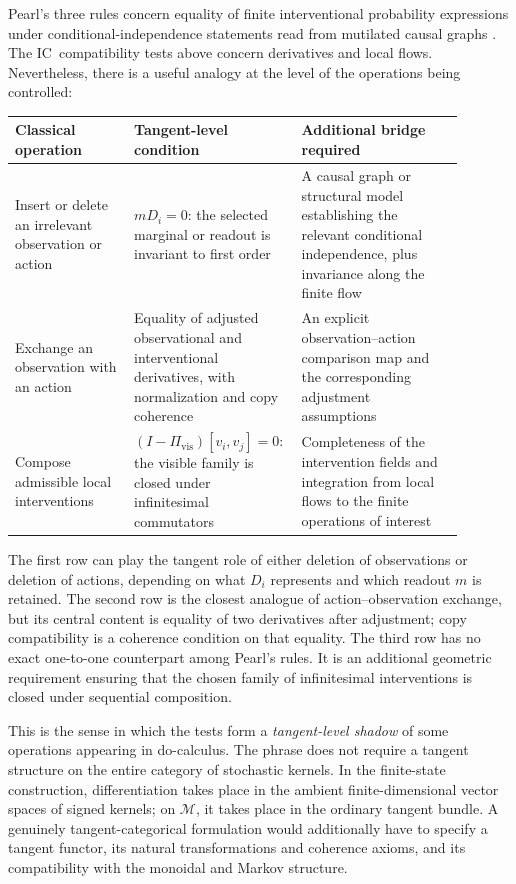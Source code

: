 \documentclass{article}
\theoremstyle{plain}
\theoremstyle{definition}
\theoremstyle{remark}
\newcommand{\M}{\mathcal M}
\newcommand{\Pvis}{\Pi_{\mathrm{vis}}}
\newcommand{\IC}{\textsc{IC}}
\begin{document}
Pearl's three rules concern equality of finite interventional probability
expressions under conditional-independence statements read from mutilated
causal graphs \citep{pearl2009causality}.  The \IC\ compatibility tests above
concern derivatives and local flows.  Nevertheless, there is a useful analogy
at the level of the operations being controlled:
\begin{center}
\begin{tabular}{p{0.25\linewidth}p{0.30\linewidth}p{0.34\linewidth}}
\toprule
\textbf{Classical operation} & \textbf{Tangent-level condition}
& \textbf{Additional bridge required}\\
\midrule
Insert or delete an irrelevant observation or action
& \(mD_i=0\): the selected marginal or readout is invariant to first order
& A causal graph or structural model establishing the relevant conditional
  independence, plus invariance along the finite flow\\
\addlinespace
Exchange an observation with an action
& Equality of adjusted observational and interventional derivatives, with
  normalization and copy coherence
& An explicit observation--action comparison map and the corresponding
  adjustment assumptions\\
\addlinespace
Compose admissible local interventions
& \((I-\Pvis)[v_i,v_j]=0\): the visible family is closed under infinitesimal
  commutators
& Completeness of the intervention fields and integration from local flows to
  the finite operations of interest\\
\bottomrule
\end{tabular}
\end{center}

The first row can play the tangent role of either deletion of observations or
deletion of actions, depending on what \(D_i\) represents and which readout
\(m\) is retained.  The second row is the closest analogue of
action--observation exchange, but its central content is equality of two
derivatives after adjustment; copy compatibility is a coherence condition on
that equality.  The third row has no exact one-to-one counterpart among
Pearl's rules.  It is an additional geometric requirement ensuring that the
chosen family of infinitesimal interventions is closed under sequential
composition.

This is the sense in which the tests form a \emph{tangent-level shadow} of
some operations appearing in do-calculus.  The phrase does not require a
tangent structure on the entire category of stochastic kernels.  In the
finite-state construction, differentiation takes place in the ambient
finite-dimensional vector spaces of signed kernels; on \(\M\), it takes place
in the ordinary tangent bundle.  A genuinely tangent-categorical formulation
would additionally have to specify a tangent functor, its natural
transformations and coherence axioms, and its compatibility with the monoidal
and Markov structure.
\end{document}
